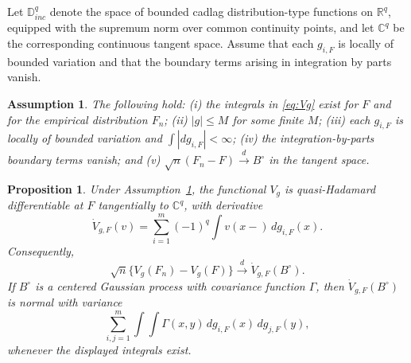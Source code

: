 \documentclass[11pt]{article}
\newtheorem{proposition}[theorem]{Proposition}
\newtheorem{assumption}[theorem]{Assumption}
\theoremstyle{definition}
\newcommand{\R}{\mathbb{R}}
\newcommand{\dto}{\xrightarrow{d}}
\begin{document}
Let \(\mathbb D^q_{inc}\) denote the space of bounded cadlag distribution-type functions on \(\R^q\), equipped with the supremum norm over common continuity points, and let \(\mathbb C^q\) be the corresponding continuous tangent space.  Assume that each \(g_{i,F}\) is locally of bounded variation and that the boundary terms arising in integration by parts vanish.

\begin{assumption}\label{ass:vg}
The following hold: (i) the integrals in \eqref{eq:Vg} exist for \(F\) and for the empirical distribution \(F_n\); (ii) \(|g|\le M\) for some finite \(M\); (iii) each \(g_{i,F}\) is locally of bounded variation and \(\int |dg_{i,F}|<\infty\); (iv) the integration-by-parts boundary terms vanish; and (v) \(\sqrt n(F_n-F)\dto B^\circ\) in the tangent space.
\end{assumption}

\begin{proposition}\label{prop:vg_derivative}
Under Assumption~\ref{ass:vg}, the functional \(V_g\) is quasi-Hadamard differentiable at \(F\) tangentially to \(\mathbb C^q\), with derivative
\begin{equation}\label{eq:vg_derivative}
\dot V_{g,F}(v)=\sum_{i=1}^m(-1)^q\int v(x-)\,dg_{i,F}(x).
\end{equation}
Consequently,
\[
\sqrt n\{V_g(F_n)-V_g(F)\}\dto \dot V_{g,F}(B^\circ).
\]
If \(B^\circ\) is a centered Gaussian process with covariance function \(\Gamma\), then \(\dot V_{g,F}(B^\circ)\) is normal with variance
\[
\sum_{i,j=1}^m\int\int \Gamma(x,y)\,dg_{i,F}(x)\,dg_{j,F}(y),
\]
whenever the displayed integrals exist.
\end{proposition}
\end{document}
